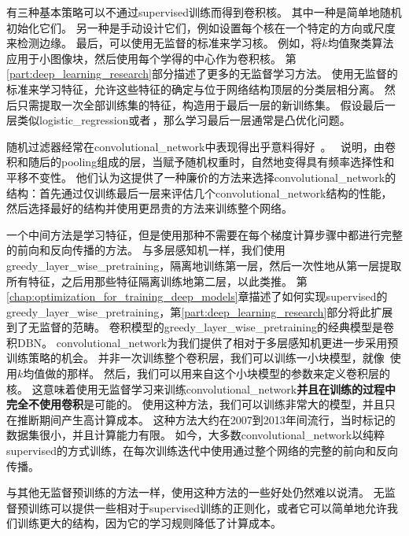有三种基本策略可以不通过\gls{supervised}训练而得到卷积核。
其中一种是简单地随机初始化它们。
另一种是手动设计它们，例如设置每个核在一个特定的方向或尺度来检测边缘。
最后，可以使用无监督的标准来学习核。
例如，\cite{Coates2011}将$k$均值聚类算法应用于小图像块，然后使用每个学得的中心作为卷积核。
第\ref{part:deep_learning_research}部分描述了更多的无监督学习方法。
使用无监督的标准来学习特征，允许这些特征的确定与位于网络结构顶层的分类层相分离。
然后只需提取一次全部训练集的特征，构造用于最后一层的新训练集。
假设最后一层类似\gls{logistic_regression}或者\,，那么学习最后一层通常是凸优化问题。

 
 
随机过滤器经常在\gls{convolutional_network}中表现得出乎意料得好~\cite{Jarrett-ICCV2009-small,Saxe-ICML2011,pinto2011scaling,cox2011beyond}。
\cite{Saxe-ICML2011}~说明，由卷积和随后的\gls{pooling}组成的层，当赋予随机权重时，自然地变得具有频率选择性和平移不变性。
他们认为这提供了一种廉价的方法来选择\gls{convolutional_network}的结构：首先通过仅训练最后一层来评估几个\gls{convolutional_network}结构的性能，然后选择最好的结构并使用更昂贵的方法来训练整个网络。

一个中间方法是学习特征，但是使用那种不需要在每个梯度计算步骤中都进行完整的前向和反向传播的方法。
与多层感知机一样，我们使用\gls{greedy_layer_wise_pretraining}，隔离地训练第一层，然后一次性地从第一层提取所有特征，之后用那些特征隔离训练地第二层，以此类推。
第\ref{chap:optimization_for_training_deep_models}章描述了如何实现\gls{supervised}的\gls{greedy_layer_wise_pretraining}，第\ref{part:deep_learning_research}部分将此扩展到了无监督的范畴。
卷积模型的\gls{greedy_layer_wise_pretraining}的经典模型是卷积\gls{DBN}\citep{HonglakL2009}。
\gls{convolutional_network}为我们提供了相对于多层感知机更进一步采用预训练策略的机会。
并非一次训练整个卷积层，我们可以训练一小块模型，就像~\cite{Coates2011}使用$k$均值做的那样。
然后，我们可以用来自这个小块模型的参数来定义卷积层的核。
这意味着使用无监督学习来训练\gls{convolutional_network}\textbf{并且在训练的过程中完全不使用卷积}是可能的。
使用这种方法，我们可以训练非常大的模型，并且只在推断期间产生高计算成本\citep{ranzato-cvpr-07-small,Jarrett-ICCV2009-small,koray-nips-10-small,icml2013_coates13}。
这种方法大约在2007到2013年间流行，当时标记的数据集很小，并且计算能力有限。
如今，大多数\gls{convolutional_network}以纯粹\gls{supervised}的方式训练，在每次训练迭代中使用通过整个网络的完整的前向和反向传播。
 
 
与其他无监督预训练的方法一样，使用这种方法的一些好处仍然难以说清。
无监督预训练可以提供一些相对于\gls{supervised}训练的正则化，或者它可以简单地允许我们训练更大的结构，因为它的学习规则降低了计算成本。

